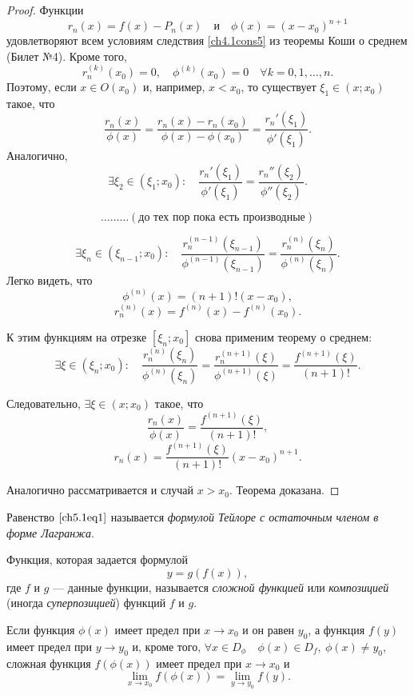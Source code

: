 \begin{proof}
Функции $$r_n(x) = f(x) - P_n(x) \quad \text{и} \quad \phi(x) = (x - x_0)^{n + 1}$$ удовлетворяют всем условиям следствия \ref{ch4.1cons5} из теоремы Коши о среднем (Билет №4). Кроме того, $$r_n^{(k)}(x_0) = 0, \quad \phi^{(k)}(x_0) = 0 \quad \forall k = 0,1,\ldots,n.$$ Поэтому, если $x \in O(x_0)$ и, например, $x < x_0$, то существует $\xi_1 \in (x; x_0)$ такое, что
$$
\frac{r_n(x)}{\phi(x)} = \frac{r_n(x) - r_n(x_0)}{\phi(x) - \phi(x_0)} = \frac{r_n'(\xi_1)}{\phi'(\xi_1)}.
$$
Аналогично,
$$
\exists \xi_2 \in (\xi_1; x_0): \quad \frac{r_n'(\xi_1)}{\phi'(\xi_1)} = \frac{r_n''(\xi_2)}{\phi''(\xi_2)}.
$$

$$\ldots\ldots\ldots (\text{до тех пор пока есть производные})$$

$$
\exists \xi_n \in (\xi_{n - 1}; x_0): \quad \frac{r_n^{(n - 1)}(\xi_{n - 1})}{\phi^{(n - 1)}(\xi_{n - 1})} = \frac{r_n^{(n)}(\xi_{n})}{\phi^{(n)}(\xi_{n})}.
$$
Легко видеть, что 
$$
\phi^{(n)}(x) = (n + 1)!(x - x_0),
$$
$$
r_n^{(n)}(x) = f^{(n)}(x) - f^{(n)}(x_0).
$$

К этим функциям на отрезке $[\xi_n; x_0]$ снова применим теорему о среднем:
$$
\exists \xi \in (\xi_n; x_0): \quad \frac{r_n^{(n)}(\xi_{n})}{\phi^{(n)}(\xi_{n})} = \frac{r_n^{(n + 1)}(\xi)}{\phi^{(n + 1)}(\xi)} = \frac{f^{(n + 1)}(\xi)}{(n + 1)!}.
$$

Следовательно, $\exists \xi \in (x; x_0)$ такое, что
$$
\frac{r_n(x)}{\phi(x)} = \frac{f^{(n + 1)}(\xi)}{(n + 1)!},
$$
$$
r_n(x) = \frac{f^{(n + 1)}(\xi)}{(n + 1)!}(x - x_0)^{n + 1}.
$$

Аналогично рассматривается и случай $x > x_0$. Теорема доказана.
\end{proof}

Равенство $\eqref{ch5.1eq1}$ называется \textit{формулой Тейлоре с остаточным членом в форме Лагранжа}.

\begin{defn}
Функция, которая задается формулой 
$$
y = g(f(x)),
$$
где $f$ и $g$ --- данные функции, называется \textit{сложной функцией} или \textit{композицией} (иногда \textit{суперпозицией}) функций $f$ и $g$.
\end{defn}

\begin{thm}
Если функция $\phi(x)$ имеет предел при $x \to x_0$ и он равен $y_0$, а функция $f(y)$ имеет предел при $y \to y_0$ и, кроме того, $\forall x \in D_\phi \quad \phi(x) \in D_f, \: \phi(x) \not= y_0$, сложная функция $f(\phi(x))$ имеет предел при $x \to x_0$ и
\begin{equation} \label{ch5.1eq3}
\lim_{x \to x_0} f(\phi(x)) = \lim_{y \to y_0} f(y).
\end{equation}
\end{thm}

